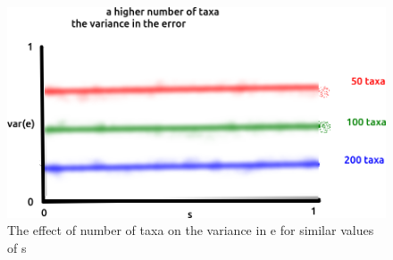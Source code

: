 \begin{figure}[!htbp]
  \includegraphics[width=\textwidth]{razzo-figures/fig_6.png}
  \caption{
    The effect of number of taxa on the variance in e
    for similar values of s
  }
  \label{fig:6}
\end{figure}
